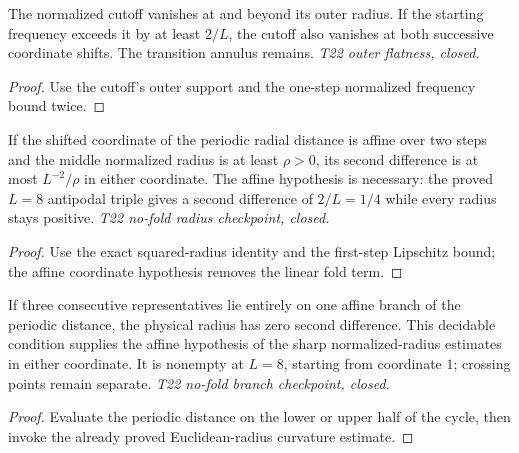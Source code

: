 \begin{lemma}
  \label{lem:normalized-cutoff-outer-flat}
  \leanok
  The normalized cutoff vanishes at and beyond its outer radius. If the
  starting frequency exceeds it by at least $2/L$, the cutoff also vanishes
  at both successive coordinate shifts. The transition annulus remains.
  \emph{T22 outer flatness, closed.}
\end{lemma}
\begin{proof}\leanok
  Use the cutoff's outer support and the one-step normalized frequency bound
  twice.
\end{proof}

\begin{lemma}
  \label{lem:normalized-radius-second-diff}
  \leanok
  If the shifted coordinate of the periodic radial distance is affine over
  two steps and the middle normalized radius is at least $\rho>0$, its
  second difference is at most $L^{-2}/\rho$ in either coordinate. The
  affine hypothesis is necessary: the proved $L=8$ antipodal triple gives a
  second difference of $2/L=1/4$ while every radius stays positive.
  \emph{T22 no-fold radius checkpoint, closed.}
\end{lemma}
\begin{proof}\leanok
  Use the exact squared-radius identity and the first-step Lipschitz bound;
  the affine coordinate hypothesis removes the linear fold term.
\end{proof}

\begin{lemma}
  \label{lem:normalized-radius-no-fold}
  \leanok
  If three consecutive representatives lie entirely on one affine branch
  of the periodic distance, the physical radius has zero second difference.
  This decidable condition supplies the affine hypothesis of the sharp
  normalized-radius estimates in either coordinate. It is nonempty at
  $L=8$, starting from coordinate $1$; crossing points remain separate.
  \emph{T22 no-fold branch checkpoint, closed.}
\end{lemma}
\begin{proof}\leanok
  Evaluate the periodic distance on the lower or upper half of the cycle,
  then invoke the already proved Euclidean-radius curvature estimate.
\end{proof}

